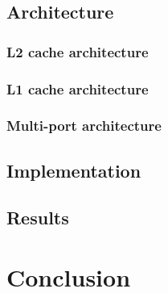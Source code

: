 \documentclass[11pt,a4paper]{memoir}
\begin{document}
\section{Architecture}
\subsection{L2 cache architecture}
\subsection{L1 cache architecture}
\subsection{Multi-port architecture}
\section{Implementation}
\section{Results}
\chapter{Conclusion}
\end{document}
